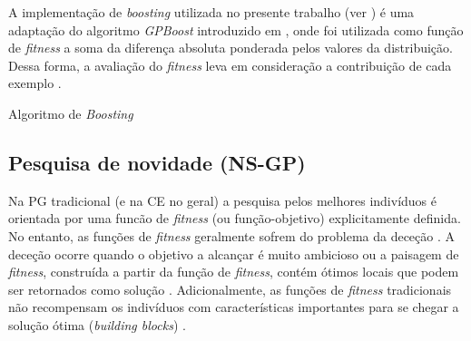 A implementação de \emph{boosting} utilizada no presente trabalho (ver ) é uma adaptação do algoritmo
\emph{GPBoost} introduzido em \citep{paris2002applying}, onde foi utilizada como função de \emph{fitness} a soma da diferença 
absoluta ponderada pelos valores da distribuição. Dessa forma, a avaliação do \emph{fitness} leva em consideração a 
contribuição de cada exemplo \citep{paris2002applying}.

\begin{algorithm}[H]
	\caption{Algoritmo de \emph{Boosting}}
	\label{Algoritmo531}
	\begin{algorithmic}[1]
		\EndFor
	\end{algorithmic}
\end{algorithm}

\subsection{Pesquisa de novidade (NS-GP)}
\label{NSGP}

Na \ac{PG} tradicional (e na \ac{CE} no geral) a pesquisa pelos melhores indivíduos é orientada por uma funcão de
\emph{fitness} (ou função-objetivo) explicitamente definida. No entanto, as funções de \emph{fitness} geralmente sofrem do problema da 
deceção \citep{Goldberg1987}. A deceção ocorre quando o objetivo a alcançar é muito ambicioso ou a paisagem de \emph{fitness}, construída 
a partir da função de \emph{fitness}, contém ótimos locais que podem ser retornados como solução \citep{Goldberg1987}. Adicionalmente, as 
funções de \emph{fitness} tradicionais não recompensam os indivíduos com características importantes para se chegar a solução 
ótima (\emph{building blocks}) \citep{Holland1975}.

